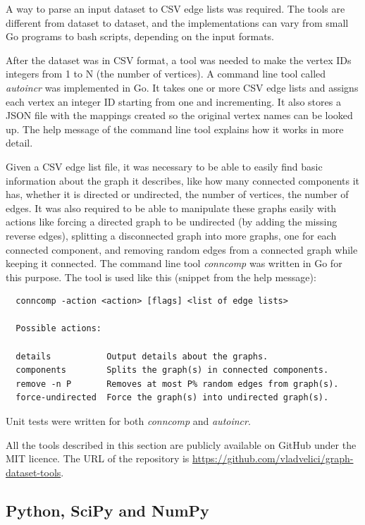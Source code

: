 \documentclass[12pt]{report}
\begin{document}
A way to parse an input dataset to CSV edge lists was required. The tools are
different from dataset to dataset, and the implementations can vary from small
Go programs to bash scripts, depending on the input formats.


After the dataset was in CSV format, a tool was needed to make the vertex IDs
integers from 1 to N (the number of vertices). A command line tool called
\emph{autoincr} was implemented in Go. It takes one or more CSV edge lists and
assigns each vertex an integer ID starting from one and incrementing. It also
stores a JSON file with the mappings created so the original vertex names can be
looked up. The help message of the command line tool explains how it works in
more detail.


Given a CSV edge list file, it was necessary to be able to easily find basic
information about the graph it describes, like how many connected components it
has, whether it is directed or undirected, the number of vertices, the number of
edges. It was also required to be able to manipulate these graphs easily with
actions like forcing a directed graph to be undirected (by adding the missing
reverse edges), splitting a disconnected graph into more graphs, one for each
connected component, and removing random edges from a connected graph while
keeping it connected. The command line tool \emph{conncomp} was written in Go
for this purpose. The tool is used like this (snippet from the help message):

\begin{lstlisting}
  conncomp -action <action> [flags] <list of edge lists>

  Possible actions:

  details           Output details about the graphs.
  components        Splits the graph(s) in connected components.
  remove -n P       Removes at most P% random edges from graph(s).
  force-undirected  Force the graph(s) into undirected graph(s).
\end{lstlisting}

Unit tests were written for both \emph{conncomp} and \emph{autoincr}.

All the tools described in this section are publicly available on GitHub under
the MIT licence. The URL of the repository is
\url{https://github.com/vladvelici/graph-dataset-tools}.

\subsection{Python, SciPy and NumPy}
\end{document}
